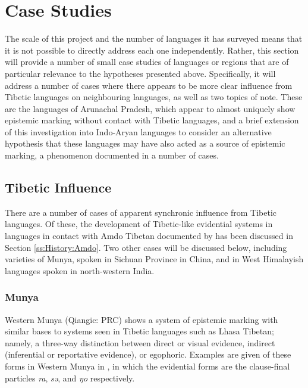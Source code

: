 \section{Case Studies}\label{s:History:CaseStudies}
The scale of this project and the number of languages it has surveyed means that it is not possible to directly address each one independently. Rather, this section will provide a number of small case studies of languages or regions that are of particular relevance to the hypotheses presented above. Specifically, it will address a number of cases where there appears to be more clear influence from Tibetic languages on neighbouring languages, as well as two topics of note. These are the languages of Arunachal Pradesh, which appear to almost uniquely show epistemic marking without contact with Tibetic languages, and a brief extension of this investigation into Indo-Aryan languages to consider an alternative hypothesis that these languages may have also acted as a source of epistemic marking, a phenomenon documented in a number of cases.
\subsection{Tibetic Influence}\label{ss:History:TibeticInfluence}
There are a number of cases of apparent synchronic influence from Tibetic languages. Of these, the development of Tibetic-like evidential systems in languages in contact with Amdo Tibetan documented by  has been discussed in Section \ref{ss:History:Amdo}. Two other cases will be discussed below, including varieties of Munya, spoken in Sichuan Province in China, and in West Himalayish languages spoken in north-western India.
\subsubsection{Munya}\label{sss:History:Munya}
Western Munya (Qiangic: PRC) shows a system of epistemic marking with similar bases to systems seen in Tibetic languages such as Lhasa Tibetan; namely, a three-way distinction between direct or visual evidence, indirect (inferential or reportative evidence), or egophoric. Examples are given of these forms in Western Munya in , in which the evidential forms are the clause-final particles \textit{ra}, \textit{sə}, and \textit{ŋo} respectively.

